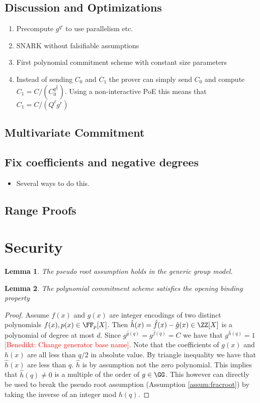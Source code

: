 \documentclass{article}
\newtheorem{lemma}{Lemma}
\newcommand{\benedikt}[1]{{\textcolor{red}{[Benedikt: #1]}}}
\newcommand{\benedikt}[1]{}
\begin{document}
\subsection{Discussion and Optimizations}
\begin{enumerate}
	\item Precompute $g^{q^i}$ to use parallelism etc.
	\item SNARK without falsifiable assumptions
	\item First polynomial commitment scheme with constant size parameters
	\item Instead of sending $C_0$ and $C_1$ the prover can simply send $C_0$ and compute $C_1=C/(C_0^{q^{\frac{d}{2}}})$. Using a non-interactive PoE this means that $C_1=C/(Q^{\ell}g^r)$
\end{enumerate}

\subsection{Multivariate Commitment}
  
\subsection{Fix coefficients and negative degrees}
\begin{itemize}
	\item Several ways to do this.
\end{itemize}

\subsection{Range Proofs}

\section{Security}

\begin{lemma}
	The pseudo root assumption holds in the generic group model.
\end{lemma}
\begin{lemma}
	The polynomial commitment scheme satisfies the opening binding property
\end{lemma}
\begin{proof}
	Assume $f(x)$ and $g(x)$ are integer encodings of two distinct polynomials $f(x),p(x) \in \FF_p[X]$. Then $\hat{h}(x)=\hat{f}(x)-\hat{g}(x) \in \ZZ[X]$ is a polynomial of degree at most $d$. Since $g^{\hat{g}(q)}=g^{\hat{f}(q)}=C$ we have that $g^{\hat{h}(q)}=1$\benedikt{Change generator base name}. Note that the coefficients of $g(x)$ and $h(x)$ are all less than $q/2$ in absolute value. By triangle inequality we have that $\hat{h}(x)$ are less than $q$. $\hat{h}$ is by assumption not the zero polynomial. This implies that $\hat{h}(q)\neq 0$ is a multiple of the order of $g\in \GG$. This however can directly be used to break the pseudo root assumption (Assumption \ref{assum:fracroot}) by taking the inverse of an integer mod $h(q)$.
\end{proof}
\end{document}

